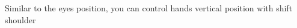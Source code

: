 \documentclass[preview]{standalone}
\begin{document}
\begin{center}
Similar to the eyes position, you can control hands vertical position with shift shoulder
\end{center}
\end{document}
